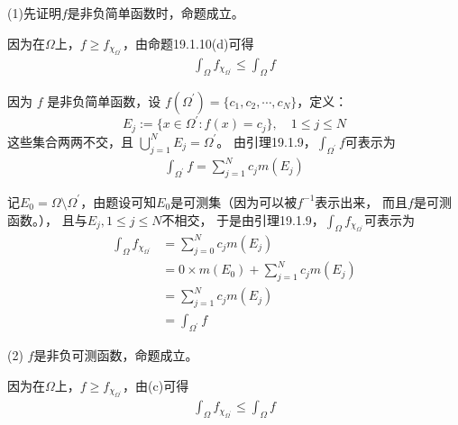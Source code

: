 \documentclass{article}
\begin{document}
\begin{itemize}
        (1)先证明$f$是非负简单函数时，命题成立。

        因为在$\Omega$上，$f \geq f_{\chi_{\Omega^\prime}}$，由命题19.1.10(d)可得
        \begin{align*}
          \int_{\Omega} f_{\chi_{\Omega^\prime}} \leq \int_{\Omega} f
        \end{align*}

        因为 $f$ 是非负简单函数，设 $f(\Omega^\prime) = \{c_1, c_2, \cdots, c_N\}$，定义：
        \[
          E_j := \{x \in \Omega^\prime : f(x) = c_j\}, \quad 1 \leq j \leq N
        \]
        这些集合两两不交，且 $\bigcup_{j=1}^N E_j = \Omega^\prime$。
        由引理19.1.9，$\int_{\Omega^\prime} f$可表示为
        \begin{align*}
          \int_{\Omega^\prime} f = \sum\limits_{j = 1}^N c_j m(E_j)
        \end{align*}

        记$E_0 = \Omega \setminus \Omega^\prime$，由题设可知$E_0$是可测集（因为可以被$f^{-1}$表示出来，
        而且$f$是可测函数。），
        且与$E_j, 1 \leq j \leq N$不相交，
        于是由引理19.1.9，$\int_{\Omega} f_{\chi_{\Omega^\prime}}$可表示为
        \begin{align*}
          \int_{\Omega} f_{\chi_{\Omega^\prime}}
           & = \sum\limits_{j = 0}^N c_j m(E_j)                   \\
           & = 0 \times m(E_0) + \sum\limits_{j = 1}^N c_j m(E_j) \\
           & = \sum\limits_{j = 1}^N c_j m(E_j)                   \\
           & = \int_{\Omega^\prime} f
        \end{align*}

        (2) $f$是非负可测函数，命题成立。

        因为在$\Omega$上，$f \geq f_{\chi_{\Omega^\prime}}$，由(c)可得
        \begin{align*}
          \int_{\Omega} f_{\chi_{\Omega^\prime}} \leq \int_{\Omega} f
        \end{align*}


\end{itemize}
\end{document}
